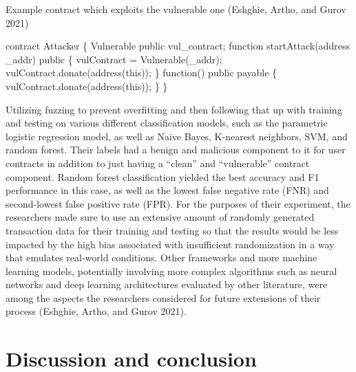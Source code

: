 \documentclass[
  11pt,
]{article}
\newenvironment{Shaded}{\begin{snugshade}}{\end{snugshade}}
\newcommand{\FunctionTok}[1]{\textcolor[rgb]{0.28,0.35,0.67}{#1}}
\newcommand{\KeywordTok}[1]{\textcolor[rgb]{0.00,0.23,0.31}{#1}}
\newcommand{\NormalTok}[1]{\textcolor[rgb]{0.00,0.23,0.31}{#1}}
\newcommand{\OperatorTok}[1]{\textcolor[rgb]{0.37,0.37,0.37}{#1}}
\begin{document}
Example contract which exploits the vulnerable one (Eshghie, Artho, and
Gurov 2021)

\begin{Shaded}
\begin{Highlighting}[]
\NormalTok{contract Attacker \{}
\NormalTok{  Vulnerable }\KeywordTok{public}\NormalTok{ vul\_contract}\OperatorTok{;}
  \KeywordTok{function} \FunctionTok{startAttack}\NormalTok{(address \_addr) }\KeywordTok{public}
\NormalTok{  \{}
\NormalTok{    vulContract }\OperatorTok{=} \FunctionTok{Vulnerable}\NormalTok{(\_addr)}\OperatorTok{;}
\NormalTok{    vulContract}\OperatorTok{.}\FunctionTok{donate}\NormalTok{(}\FunctionTok{address}\NormalTok{(}\KeywordTok{this}\NormalTok{))}\OperatorTok{;}
\NormalTok{  \}}
  \KeywordTok{function}\NormalTok{() }\KeywordTok{public}\NormalTok{ payable}
\NormalTok{  \{}
\NormalTok{    vulContract}\OperatorTok{.}\FunctionTok{donate}\NormalTok{(}\FunctionTok{address}\NormalTok{(}\KeywordTok{this}\NormalTok{))}\OperatorTok{;}
\NormalTok{  \}}
\NormalTok{\}}
\end{Highlighting}
\end{Shaded}

Utilizing fuzzing to prevent overfitting and then following that up with
training and testing on various different classification models, such as
the parametric logistic regression model, as well as Naive Bayes,
K-nearest neighbors, SVM, and random forest. Their labels had a benign
and malicious component to it for user contracts in addition to just
having a ``clean'' and ``vulnerable'' contract component. Random forest
classification yielded the best accuracy and F1 performance in this
case, as well as the lowest false negative rate (FNR) and second-lowest
false positive rate (FPR). For the purposes of their experiment, the
researchers made sure to use an extensive amount of randomly generated
transaction data for their training and testing so that the results
would be less impacted by the high bias associated with insufficient
randomization in a way that emulates real-world conditions. Other
frameworks and more machine learning models, potentially involving more
complex algorithms such as neural networks and deep learning
architectures evaluated by other literature, were among the aspects the
researchers considered for future extensions of their process (Eshghie,
Artho, and Gurov 2021).

\hypertarget{discussion-and-conclusion}{%
\section{Discussion and conclusion}\label{discussion-and-conclusion}}
\end{document}
